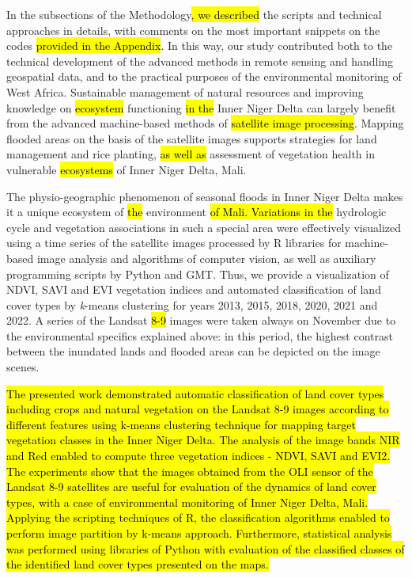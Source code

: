 \documentclass[12pt,a4paper,oneside]{article}
\def \newpar{\vspace{6pt}}
\begin{document}
\newpar In the subsections of the Methodology\hl{, we described} the scripts and technical approaches in details, with\hl{ }comments on the most important snippets on the codes \hl{provided in the Appendix}. In this way, our study contributed both to the technical development of the advanced methods in remote sensing and handling geospatial data, and to the practical purposes of the environmental monitoring of West Africa. Sustainable management of natural resources and improving knowledge on \hl{ecosystem} functioning \hl{in the} Inner Niger Delta\hl{ }can largely benefit from the advanced machine-based methods of \hl{satellite image processing}. Mapping flooded areas on the basis of the satellite images supports strategies for land management and rice planting, \hl{as well as} assessment of vegetation health in vulnerable \hl{ecosystems} of Inner Niger Delta, Mali. 

\newpar The physio-geographic phenomenon of seasonal floods in Inner Niger Delta makes it a unique ecosystem of \hl{the }environment \hl{of Mali. Variations in the} hydrologic cycle and vegetation associations in such a special area were effectively visualized using a time series of the satellite images processed by R libraries for machine-based image analysis and algorithms of computer vision, as well as auxiliary programming scripts by Python and GMT. Thus, we provide a visualization of NDVI, SAVI and EVI vegetation indices and automated classification of land cover types by \emph{k}-means clustering for years 2013, 2015, 2018, 2020, 2021 and 2022. A series of the Landsat \hl{8-9} images were taken always on November due to the environmental specifics explained above: in this period, the highest contrast between the inundated lands and flooded areas can be depicted on the image scenes. 

\hl{The presented work demonstrated automatic classification of land cover types including crops and natural vegetation on the Landsat 8-9 images according to different features using k-means clustering technique for mapping target vegetation classes in the Inner Niger Delta. The analysis of the image bands NIR and Red enabled to compute three vegetation indices - NDVI, SAVI and EVI2. The experiments show that the images obtained from the OLI sensor of the Landsat 8-9 satellites are useful for evaluation of the dynamics of land cover types, with a case of environmental monitoring of Inner Niger Delta, Mali. Applying the scripting techniques of R, the classification algorithms enabled to perform image partition by k-means approach. Furthermore, statistical analysis was performed using libraries of Python with evaluation of the classified classes of the identified land cover types presented on the maps.}
\end{document}
